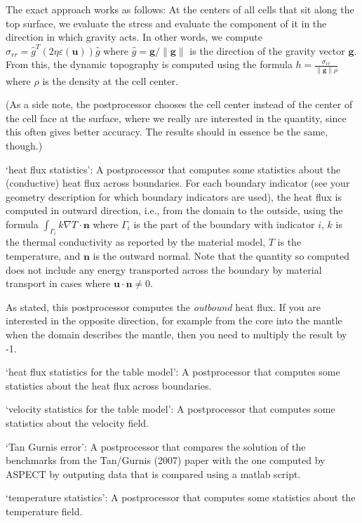 \begin{itemize}
The exact approach works as follows: At the centers of all cells that sit along the top surface, we evaluate the stress and evaluate the component of it in the direction in which gravity acts. In other words, we compute $\sigma_{rr}={\hat g}^T(2 \eta \varepsilon(\mathbf u))\hat g$ where $\hat g = \mathbf g/\|\mathbf g\|$ is the direction of the gravity vector $\mathbf g$. From this, the dynamic topography is computed using the formula $h=\frac{\sigma_{rr}}{\|\mathbf g\| \rho}$ where $\rho$ is the density at the cell center.

(As a side note, the postprocessor chooses the cell center instead of the center of the cell face at the surface, where we really are interested in the quantity, since this often gives better accuracy. The results should in essence be the same, though.)

`heat flux statistics': A postprocessor that computes some statistics about the (conductive) heat flux across boundaries. For each boundary indicator (see your geometry description for which boundary indicators are used), the heat flux is computed in outward direction, i.e., from the domain to the outside, using the formula $\int_{\Gamma_i} k \nabla T \cdot \mathbf n$ where $\Gamma_i$ is the part of the boundary with indicator $i$, $k$ is the thermal conductivity as reported by the material model, $T$ is the temperature, and $\mathbf n$ is the outward normal. Note that the quantity so computed does not include any energy transported across the boundary by material transport in cases where $\mathbf u \cdot \mathbf n \neq 0$.

As stated, this postprocessor computes the \textit{outbound} heat flux. If you are interested in the opposite direction, for example from the core into the mantle when the domain describes the mantle, then you need to multiply the result by -1.

`heat flux statistics for the table model': A postprocessor that computes some statistics about the heat flux across boundaries.

`velocity statistics for the table model': A postprocessor that computes some statistics about the velocity field.

`Tan Gurnis error': A postprocessor that compares the solution of the benchmarks from the Tan/Gurnis (2007) paper with the one computed by ASPECT by outputing data that is compared using a matlab script.

`temperature statistics': A postprocessor that computes some statistics about the temperature field.


\end{itemize}
